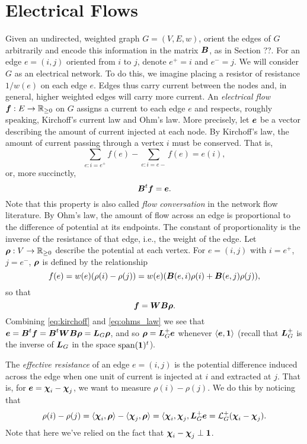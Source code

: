 \section{Electrical Flows}
Given an undirected, weighted graph $G=(V,E,w)$, orient the edges of $G$ arbitrarily and encode this information in the matrix $\vb*{B}$, as in Section ??. For an edge $e=(i,j)$ oriented from $i$ to $j$, denote $e^+=i$ and $e^-=j$. 
We will consider $G$ as an electrical network. To do this, we imagine placing a resistor of resistance $1/w(e)$ on each edge $e$. Edges thus carry current between the nodes and, in general, higher weighted edges will carry more current.  
An \emph{electrical flow $\vb*{f}:E\to\mathbb{R}_{\geq 0}$} on $G$ assigns a current to each edge $e$ and respects, roughly speaking, Kirchoff's current law and Ohm's law. More precisely, let $\vb*{e}$ be a vector describing the amount of current injected at each node. By Kirchoff's law, the amount of current passing through a vertex $i$ must be conserved. That is, 
\[\sum_{e:i=e^+}f(e) - \sum_{e:i=e-}f(e) = e(i),\]
or, more succinctly, 
\begin{equation}
\label{eq:kirchoff}
    \vb*{B}^t \vb*{f}=\vb*{e}. 
\end{equation}
Note that this property is also called \emph{flow conversation} in the network flow literature. 
By Ohm's law, the amount of flow across an edge is proportional to the difference of potential at its endpoints. The constant of proportionality is the inverse of the resistance of that edge, i.e., the weight of the edge. Let $\vb*{\rho}:V\to\mathbb{R}_{\geq 0}$ describe the potential at each vertex. For $e=(i,j)$ with $i=e^+$, $j=e^-$, $\vb*{\rho}$ is defined by the relationship 
\begin{equation*}
    f(e) = w(e)(\rho(i)-\rho(j)) = w(e) (\vb*{B}(e,i)\rho(i) + \vb*{B}(e,j)\rho(j)),
\end{equation*}
so that
\begin{equation}
\label{eq:ohms_law}
    \vb*{f}=\vb*{W}\vb*{B}\vb*{\rho}.
\end{equation}
Combining \eqref{eq:kirchoff} and \eqref{eq:ohms_law} we see that $\vb*{e}=\vb*{B}^t \vb*{f}=\vb*{B}^t \vb*{W}\vb*{B} \vb*{\rho} = \vb*{L}_G\vb*{\rho}$, and so $\vb*{\rho} = \vb*{L}_G^+\vb*{e}$ whenever $\langle \vb*{e},\vb{1}\rangle$ (recall that $\vb*{L}_G^+$ is the inverse of $\vb*{L}_G$ in the space $\textnormal{span}(\vb{1})^t$).  

The \emph{effective resistance} of an edge $e=(i,j)$ is the potential difference induced across the edge when one unit of current is injected at $i$ and extracted at $j$. That is, for $\vb*{e}=\boldsymbol{\chi}_i-\boldsymbol{\chi}_j$, we want to measure $\rho(i)-\rho(j)$. We do this by noticing that 
\[\rho(i)-\rho(j) = \langle \boldsymbol{\chi}_i,\vb*{\rho}\rangle - \langle \boldsymbol{\chi}_j,\vb*{\rho}\rangle = \langle \boldsymbol{\chi}_i,\boldsymbol{\chi}_j,\vb*{L}_G^+\vb*{e}=\mathcal{L}_G^+(\boldsymbol{\chi}_i-\boldsymbol{\chi}_j).\]
Note that here we've relied on the fact that $\boldsymbol{\chi}_i-\boldsymbol{\chi}_j\perp \vb{1}$. 


